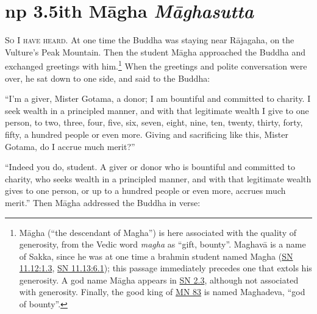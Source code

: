 \documentclass[12pt,openany]{book}%
\newcommand*{\suttatitleacronym}[1]{\smaller[2]{#1}\vspace*{.3em}}
\newcommand*{\suttatitletranslation}[1]{\linebreak{#1}}
\newcommand*{\suttatitleroot}[1]{\linebreak\smaller[2]\itshape{#1}}
\newcommand*{\tocacronym}[1]{\hspace*{-3.3em}{#1}\quad}
\newcommand*{\toctranslation}[1]{#1}
\newcommand*{\tocroot}[1]{(\textit{#1})}
\newcommand*{\scevam}[1]{\textsc{#1}}
\begin{document}
%
\section*{{\suttatitleacronym Snp 3.5}{\suttatitletranslation With Māgha }{\suttatitleroot Māghasutta}}
\addcontentsline{toc}{section}{\tocacronym{Snp 3.5} \toctranslation{With Māgha } \tocroot{Māghasutta}}

\scevam{So I have heard. }At one time the Buddha was staying near \textsanskrit{Rājagaha}, on the Vulture’s Peak Mountain. Then the student \textsanskrit{Māgha} approached the Buddha and exchanged greetings with him.\footnote{\textsanskrit{Māgha} (“the descendant of Magha”) is here associated with the quality of generosity, from the Vedic word \textit{magha} as “gift, bounty”. \textsanskrit{Maghavā} is a name of Sakka, since he was at one time a brahmin student named Magha (\href{https://suttacentral.net/sn11.12/en/sujato\#1.3}{SN 11.12:1.3}, \href{https://suttacentral.net/sn11.13/en/sujato\#6.1}{SN 11.13:6.1}); this passage immediately precedes one that extols his generosity. A god name \textsanskrit{Māgha} appears in \href{https://suttacentral.net/sn2.3/en/sujato}{SN 2.3}, although not associated with generosity. Finally, the good king of \href{https://suttacentral.net/mn83/en/sujato}{MN 83} is named Maghadeva, “god of bounty”. } When the greetings and polite conversation were over, he sat down to one side, and said to the Buddha: 

“I’m a giver, Mister Gotama, a donor; I am bountiful and committed to charity. I seek wealth in a principled manner, and with that legitimate wealth I give to one person, to two, three, four, five, six, seven, eight, nine, ten, twenty, thirty, forty, fifty, a hundred people or even more. Giving and sacrificing like this, Mister Gotama, do I accrue much merit?” 

“Indeed you do, student. A giver or donor who is bountiful and committed to charity, who seeks wealth in a principled manner, and with that legitimate wealth gives to one person, or up to a hundred people or even more, accrues much merit.” Then \textsanskrit{Māgha} addressed the Buddha in verse: 
\end{document}
